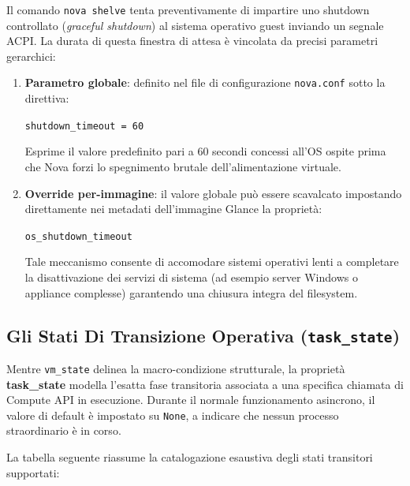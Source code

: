 \documentclass[11pt, a4paper]{article}
\begin{document}
Il comando \texttt{nova shelve} tenta preventivamente di impartire uno shutdown controllato (\emph{graceful shutdown}) al sistema operativo guest inviando un segnale ACPI. La durata di questa finestra di attesa è vincolata da precisi parametri gerarchici:
\begin{enumerate}
    \item \textbf{Parametro globale}: definito nel file di configurazione \texttt{nova.conf} sotto la direttiva:
    \begin{center}
        \texttt{shutdown\_timeout = 60}
    \end{center}
    Esprime il valore predefinito pari a $60$ secondi concessi all'OS ospite prima che Nova forzi lo spegnimento brutale dell'alimentazione virtuale.
    \item \textbf{Override per-immagine}: il valore globale può essere scavalcato impostando direttamente nei metadati dell'immagine Glance la proprietà:
    \begin{center}
        \texttt{os\_shutdown\_timeout}
    \end{center}
    Tale meccanismo consente di accomodare sistemi operativi lenti a completare la disattivazione dei servizi di sistema (ad esempio server Windows o appliance complesse) garantendo una chiusura integra del filesystem.
\end{enumerate}

\subsection{Gli Stati Di Transizione Operativa (\texttt{task\_state})}

Mentre \texttt{vm\_state} delinea la macro-condizione strutturale, la proprietà \textbf{task\_state} modella l'esatta fase transitoria associata a una specifica chiamata di Compute API in esecuzione. Durante il normale funzionamento asincrono, il valore di default è impostato su \texttt{None}, a indicare che nessun processo straordinario è in corso.

La tabella seguente riassume la catalogazione esaustiva degli stati transitori supportati:
\end{document}
